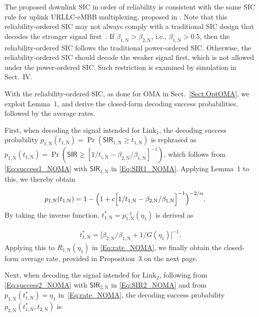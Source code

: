 \documentclass[conference]{IEEEtran}
\def\SIR{\mathsf{SIR}}
\def\({\left(}
\def\){\right)}
\def\SIRn{\widetilde{\SIR}}
\def\NOMA{\text{N}}
\def\L{\text{Link}}
\def\SIRn{\overline{\SIR}}
\begin{document}
The proposed downlink SIC in order of reliability is consistent with the same SIC rule for uplink URLLC-eMBB multiplexing, proposed in \cite{Petar5G:18}. Note that this reliability-ordered SIC may not always comply with a traditional SIC design that decodes the stronger signal first~\cite{3GPPMUST:2015,TseBook:FundamaentalsWC:2005}. If $\beta_{1,\NOMA}>\beta_{2,\NOMA}$, i.e., $\beta_{1,\NOMA}>0.5$, then the reliability-ordered SIC follows the traditional power-ordered SIC. Otherwise, the reliability-ordered SIC should decode the weaker signal first, which is not allowed under the power-ordered SIC. Such restriction is examined by simulation in Sect.~IV.


With the reliability-ordered SIC, as done for OMA in Sect.~\ref{Sect:OptOMA}, we exploit Lemma~1, and derive the closed-form decoding success probabilities, followed by the average rates.

First, when decoding the signal intended for $\L_1$, the decoding success probability $p_{1,\NOMA}(t_{1,\NOMA})=\Pr\(\SIR_{1,\NOMA} \geq t_{1,\NOMA}\)$ is rephrased as $p_{1,\NOMA}(t_{1,\NOMA})=\Pr(\SIRn \geq [1/t_{i,\NOMA}-\beta_{2,\NOMA}/\beta_{1,\NOMA}]^{-1})$, which follows from \eqref{Eq:success1_NOMA} with $\SIR_{1,\NOMA}$ in \eqref{Eq:SIR1_NOMA}. Applying Lemma~1 to this, we thereby obtain

\vspace{-10pt}\small\begin{align}
\hspace{-5pt} p_{1,\NOMA}(t_{1,\NOMA}) &=  1-\Big(1 + c\Big[{1}/{t_{1,\NOMA}}-{\beta_{2,\NOMA}}/{\beta_{1,\NOMA}}\Big]^{-1}\Big)^{-{2}/{\alpha}}. \label{Eq:Prop3pf1}
\end{align}\normalsize
By taking the inverse function, $t_{1,\NOMA}^*=p_{1,\NOMA}^{-1}(\eta_1)$ is derived as

\vspace{-10pt}\small\begin{align}
t_{1,\NOMA}^* = \Big[\beta_{2,\NOMA}/\beta_{1,\NOMA} + 1/G(\eta_1) \Big]^{-1}. \label{Eq:t1NOMAOpt}
\end{align}\normalsize
Applying this to $R_{1,\NOMA}(\eta_1)$ in \eqref{Eq:rate_NOMA}, we finally obtain the closed-form average rate, provided in Proposition~3 on the next page.


Next, when decoding the signal intended for $\L_2$, following from \eqref{Eq:success2_NOMA} with $\SIR_{2,\NOMA}$ in \eqref{Eq:SIR2_NOMA} and from $p_{1,\NOMA}(t_{1,\NOMA}^*)=\eta_1$ in~\eqref{Eq:rate_NOMA}, the decoding success probability $p_{2,\NOMA}(t_{1,\NOMA}^*, t_{2,\NOMA})$ is
\end{document}
